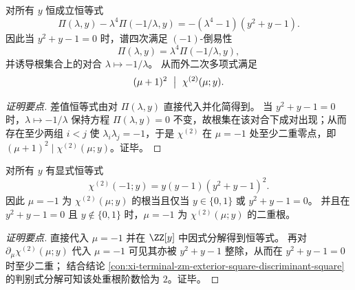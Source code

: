 \begin{conclusion}\label{con:xi-terminal-zm-minus-one-reciprocity-exterior-square}
对所有 \(y\) 恒成立恒等式
\[
\Pi(\lambda,y)-\lambda^{4}\Pi(-1/\lambda,y)=-(\lambda^{4}-1)(y^{2}+y-1).
\]
因此当 \(y^{2}+y-1=0\) 时，谱四次满足 \((-1)\)-倒易性
\[
\Pi(\lambda,y)=\lambda^{4}\Pi(-1/\lambda,y),
\]
并诱导根集合上的对合 \(\lambda\mapsto -1/\lambda\)。
从而外二次多项式满足
\[
(\mu+1)^{2}\ \bigm|\ \chi^{(2)}(\mu;y).
\]
\end{conclusion}
\begin{proof}[证明要点]
差值恒等式由对 \(\Pi(\lambda,y)\) 直接代入并化简得到。
当 \(y^{2}+y-1=0\) 时，\(\lambda\mapsto -1/\lambda\) 保持方程 \(\Pi(\lambda,y)=0\) 不变，故根集在该对合下成对出现；从而存在至少两组 \(i<j\) 使 \(\lambda_i\lambda_j=-1\)，于是 \(\chi^{(2)}\) 在 \(\mu=-1\) 处至少二重零点，即 \((\mu+1)^2\mid \chi^{(2)}(\mu;y)\)。证毕。
\end{proof}

\begin{conclusion}[\texorpdfstring{$\mu=-1$}{mu=-1} 的黄金比共振判别与二重根结构]\label{con:xi-terminal-zm-exterior-square-mu-minus-one-resonance}
对所有 \(y\) 有显式恒等式
\[
\boxed{\;\chi^{(2)}(-1;y)=y(y-1)(y^2+y-1)^2.\;}
\]
因此 \(\mu=-1\) 为 \(\chi^{(2)}(\mu;y)\) 的根当且仅当
\(
y\in\{0,1\}
\)
或
\(
y^2+y-1=0
\)。
并且在 \(y^2+y-1=0\) 且 \(y\notin\{0,1\}\) 时，\(\mu=-1\) 为 \(\chi^{(2)}(\mu;y)\) 的二重根。
\end{conclusion}
\begin{proof}[证明要点]
直接代入 \(\mu=-1\) 并在 \(\ZZ[y]\) 中因式分解得到恒等式。
再对 \(\partial_\mu\chi^{(2)}(\mu;y)\) 代入 \(\mu=-1\) 可见其亦被 \(y^2+y-1\) 整除，从而在 \(y^2+y-1=0\) 时至少二重；
结合结论 \ref{con:xi-terminal-zm-exterior-square-discriminant-square} 的判别式分解可知该处重根阶数恰为 \(2\)。证毕。
\end{proof}

